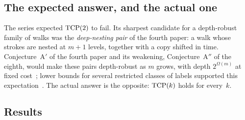 \subsection{The expected answer, and the actual one}

The series expected $\mathrm{TCP}(2)$ to fail. Its sharpest candidate for a depth-robust family of walks was the \emph{deep-nesting
pair} of the fourth paper: a walk whose strokes are nested at $m+1$ levels, together with a copy shifted in time. Conjecture~A$'$
of the fourth paper and its weakening, Conjecture~A$''$ of the eighth, would make these pairs depth-robust as $m$ grows, with depth
$2^{\Omega(m)}$ at fixed cost~\cite[Corollary~5.26]{EighthPaper2026}; lower bounds for several restricted classes of labels
supported this expectation~\cite{FourthPaper2026,EighthPaper2026,DirectedReciprocity2026,MergeDepth2026}. The actual answer is the
opposite: $\mathrm{TCP}(k)$ holds for every~$k$.

\subsection{Results}

